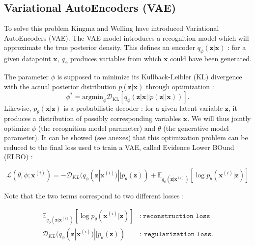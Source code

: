 \documentclass{article}
\begin{document}
\subsection{Variational AutoEncoders (VAE)}




To solve this problem Kingma and Welling \cite{kingmaAutoEncodingVariationalBayes2022} have introduced Variational AutoEncoders (VAE). The VAE model introduces a recognition model which will approximate the true posterior density. This defines an encoder $q_\phi(\textbf{z} | \textbf{x})$ : for a given datapoint $\textbf{x}$, $q_\phi$ produces variables from which $\textbf{x}$ could have been generated. 

The parameter $\phi$ is supposed to minimize its Kullback-Leibler (KL) divergence with the actual posterior distribution $p(\textbf{z}|\textbf{x})$ through optimization :
\begin{equation}
    \phi^* = \text{argmin}_{\phi} \mathcal{D}_{\text{KL}}[q_\phi(\textbf{z}|\textbf{x}||p(\textbf{z}||\textbf{x}))].
\end{equation}
Likewise, $p_\theta(\textbf{x}|\textbf{z})$ is a probabilistic decoder : for a given latent variable $\textbf{z}$, it produces a distribution of possibly corresponding variables $\textbf{x}$. We will thus jointly optimize $\phi$ (the recognition model parameter) and $\theta$ (the generative model parameter). It can be showed (see anexes) that this optimization problem can be reduced to the final loss used to train a VAE, called Evidence Lower BOund (ELBO) :

\begin{equation}\label{loss1}
    \mathcal{L}(\theta, \phi ; \textbf{x}^{(i)}) = -\mathcal{D}_{KL}(q_\phi(\textbf{z} | \textbf{x}^{(i)}) || p_\theta(\textbf{z})) + \mathbb{E}_{q_\phi(\textbf{z} | \textbf{x}^{(i)})} [\log p_\theta(\textbf{x}^{(i)} | \textbf{z})]
\end{equation}


Note that the two terms correspond to two different losses :

\begin{align*}
    \mathbb{E}_{q_\phi(\textbf{z} | \textbf{x}^{(i)})} [\log p_\theta(\textbf{x}^{(i)} | \textbf{z})] &:\ \texttt{reconstruction loss} \\
    \mathcal{D}_{KL}(q_\phi(\textbf{z} | \textbf{x}^{(i)}) || p_\theta(\textbf{z})) &:\ \texttt{regularization loss}.
\end{align*}
\end{document}
